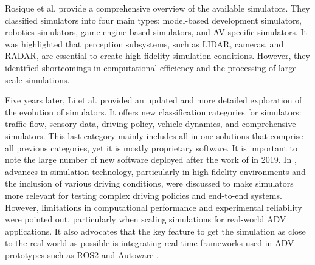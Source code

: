 \documentclass[conference]{IEEEtran}
\begin{document}

Rosique et al. \cite{Rosique2019} provide a comprehensive overview of the available simulators. They classified simulators into four main types: model-based development simulators, robotics simulators, game engine-based simulators, and AV-specific simulators. It was highlighted that perception subsystems, such as LIDAR, cameras, and RADAR, are essential to create high-fidelity simulation conditions. However, they identified shortcomings in computational efficiency and the processing of large-scale simulations.

Five years later, Li et al. \cite{Li2024} provided an updated and more detailed exploration of the evolution of simulators. It offers new classification categories for simulators: traffic flow, sensory data, driving policy, vehicle dynamics, and comprehensive simulators. This last category mainly includes all-in-one solutions that comprise all previous categories, yet it is mostly proprietary software. It is important to note the large number of new software deployed after the work of \cite{Rosique2019} in 2019. In \cite{Li2024}, advances in simulation technology, particularly in high-fidelity environments and the inclusion of various driving conditions, were discussed to make simulators more relevant for testing complex driving policies and end-to-end systems. However, limitations in computational performance and experimental reliability were pointed out, particularly when scaling simulations for real-world ADV applications. It also advocates that the key feature to get the simulation as close to the real world as possible is integrating real-time frameworks used in ADV prototypes such as ROS2 \cite{ros} and Autoware \cite{kato2018}.

\end{document}

